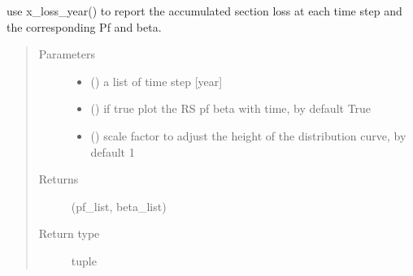 \documentclass[letterpaper,10pt,english]{sphinxmanual}
\begin{document}
\begin{fulllineitems}
\begin{fulllineitems}
\begin{quote}
\begin{description}
\end{description}\end{quote}

\end{fulllineitems}


\begin{fulllineitems}
\label{\detokenize{corrosion:corrosion.Section_loss_Model.section_loss_with_year}}
\sphinxAtStartPar
use x\_loss\_year() to report the accumulated section loss at each time step and
the corresponding Pf and beta.
\begin{quote}\begin{description}
\item[{Parameters}] \leavevmode\begin{itemize}
\item {} 
\sphinxAtStartPar
{} () \textendash{} a list of time step {[}year{]}

\item {} 
\sphinxAtStartPar
{} (\sphinxstyleliteralemphasis{\sphinxupquote{, }}) \textendash{} if true plot the RS pf beta with time, by default True

\item {} 
\sphinxAtStartPar
{} (\sphinxstyleliteralemphasis{\sphinxupquote{, }}) \textendash{} scale factor to adjust the height of the distribution curve, by default 1

\end{itemize}

\item[{Returns}] \leavevmode
\sphinxAtStartPar
(pf\_list, beta\_list)

\item[{Return type}] \leavevmode
\sphinxAtStartPar
tuple

\end{description}\end{quote}

\end{fulllineitems}


\end{fulllineitems}
\end{document}
